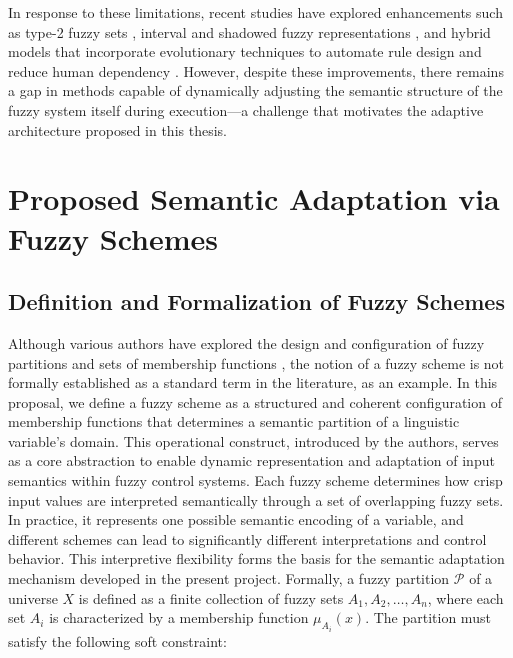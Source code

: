 In response to these limitations, recent studies have explored enhancements such as type-2 fuzzy sets \parencite{castillo2018generalized, patel2022shadowed}, interval and shadowed fuzzy representations \parencite{castillo2021high, castillo2019shadowed}, and hybrid models that incorporate evolutionary techniques to automate rule design and reduce human dependency \parencite{marques2011parameter, castillo2018generalized}. However, despite these improvements, there remains a gap in methods capable of dynamically adjusting the semantic structure of the fuzzy system itself during execution—a challenge that motivates the adaptive architecture proposed in this thesis.


\section{Proposed Semantic Adaptation via Fuzzy Schemes}



\subsection{Definition and Formalization of Fuzzy Schemes}
Although various authors have explored the design and configuration of fuzzy partitions and sets of membership functions \parencite{sadollah2018introductory, dombi2021modifiers}, the notion of a fuzzy scheme is not formally established as a standard term in the literature, as an example. In this proposal, we define a fuzzy scheme as a structured and coherent configuration of membership functions that determines a semantic partition of a linguistic variable’s domain. This operational construct, introduced by the authors, serves as a core abstraction to enable dynamic representation and adaptation of input semantics within fuzzy control systems.
Each fuzzy scheme determines how crisp input values are interpreted semantically through a set of overlapping fuzzy sets. In practice, it represents one possible semantic encoding of a variable, and different schemes can lead to significantly different interpretations and control behavior. This interpretive flexibility forms the basis for the semantic adaptation mechanism developed in the present project.
Formally, a fuzzy partition $\mathcal{P}$ of a universe $X$ is defined as a finite collection of fuzzy sets $A_1, A_2, \dots, A_n$, where each set $A_i$ is characterized by a membership function $\mu_{A_i}(x)$. The partition must satisfy the following soft constraint:

